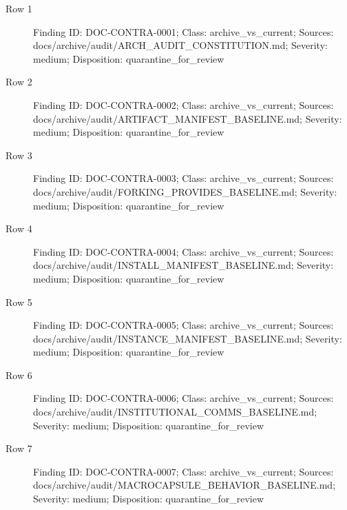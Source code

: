 \documentclass[9pt,a4paper]{book}
\begin{document}
\begin{description}
\item[Row 1] Finding ID: DOC-\allowbreak{}CONTRA-\allowbreak{}0001; Class: archive\_\allowbreak{}vs\_\allowbreak{}current; Sources: docs/\allowbreak{}archive/\allowbreak{}audit/\allowbreak{}ARCH\_\allowbreak{}AUDIT\_\allowbreak{}CONSTITUTION.\allowbreak{}md; Severity: medium; Disposition: quarantine\_\allowbreak{}for\_\allowbreak{}review
\item[Row 2] Finding ID: DOC-\allowbreak{}CONTRA-\allowbreak{}0002; Class: archive\_\allowbreak{}vs\_\allowbreak{}current; Sources: docs/\allowbreak{}archive/\allowbreak{}audit/\allowbreak{}ARTIFACT\_\allowbreak{}MANIFEST\_\allowbreak{}BASELINE.\allowbreak{}md; Severity: medium; Disposition: quarantine\_\allowbreak{}for\_\allowbreak{}review
\item[Row 3] Finding ID: DOC-\allowbreak{}CONTRA-\allowbreak{}0003; Class: archive\_\allowbreak{}vs\_\allowbreak{}current; Sources: docs/\allowbreak{}archive/\allowbreak{}audit/\allowbreak{}FORKING\_\allowbreak{}PROVIDES\_\allowbreak{}BASELINE.\allowbreak{}md; Severity: medium; Disposition: quarantine\_\allowbreak{}for\_\allowbreak{}review
\item[Row 4] Finding ID: DOC-\allowbreak{}CONTRA-\allowbreak{}0004; Class: archive\_\allowbreak{}vs\_\allowbreak{}current; Sources: docs/\allowbreak{}archive/\allowbreak{}audit/\allowbreak{}INSTALL\_\allowbreak{}MANIFEST\_\allowbreak{}BASELINE.\allowbreak{}md; Severity: medium; Disposition: quarantine\_\allowbreak{}for\_\allowbreak{}review
\item[Row 5] Finding ID: DOC-\allowbreak{}CONTRA-\allowbreak{}0005; Class: archive\_\allowbreak{}vs\_\allowbreak{}current; Sources: docs/\allowbreak{}archive/\allowbreak{}audit/\allowbreak{}INSTANCE\_\allowbreak{}MANIFEST\_\allowbreak{}BASELINE.\allowbreak{}md; Severity: medium; Disposition: quarantine\_\allowbreak{}for\_\allowbreak{}review
\item[Row 6] Finding ID: DOC-\allowbreak{}CONTRA-\allowbreak{}0006; Class: archive\_\allowbreak{}vs\_\allowbreak{}current; Sources: docs/\allowbreak{}archive/\allowbreak{}audit/\allowbreak{}INSTITUTIONAL\_\allowbreak{}COMMS\_\allowbreak{}BASELINE.\allowbreak{}md; Severity: medium; Disposition: quarantine\_\allowbreak{}for\_\allowbreak{}review
\item[Row 7] Finding ID: DOC-\allowbreak{}CONTRA-\allowbreak{}0007; Class: archive\_\allowbreak{}vs\_\allowbreak{}current; Sources: docs/\allowbreak{}archive/\allowbreak{}audit/\allowbreak{}MACROCAPSULE\_\allowbreak{}BEHAVIOR\_\allowbreak{}BASELINE.\allowbreak{}md; Severity: medium; Disposition: quarantine\_\allowbreak{}for\_\allowbreak{}review

\end{description}
\end{document}
